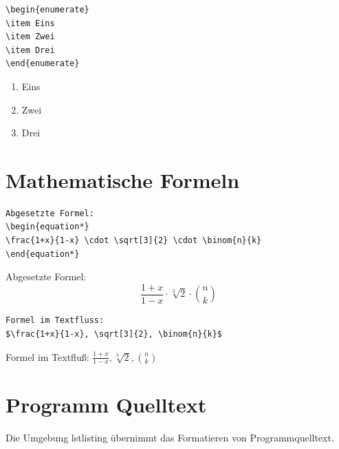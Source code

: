 \noindent
\begin{minipage}[c]{0.3\linewidth}
\begin{Verbatim}[frame=single]
\begin{enumerate}
\item Eins
\item Zwei
\item Drei
\end{enumerate}
\end{Verbatim}
\end{minipage}
\begin{minipage}[c]{0.5\linewidth}
\begin{enumerate}
\item Eins
\item Zwei
\item Drei
\end{enumerate}
\end{minipage}

\section{Mathematische Formeln}

\begin{Verbatim}[frame=single]
Abgesetzte Formel:
\begin{equation*}
\frac{1+x}{1-x} \cdot \sqrt[3]{2} \cdot \binom{n}{k}
\end{equation*}
\end{Verbatim}

Abgesetzte Formel:
\begin{equation*}
\frac{1+x}{1-x} \cdot \sqrt[3]{2} \cdot \binom{n}{k}
\end{equation*}

\begin{Verbatim}[frame=single]
Formel im Textfluss:
$\frac{1+x}{1-x}, \sqrt[3]{2}, \binom{n}{k}$
\end{Verbatim}

Formel im Textfluß: $\frac{1+x}{1-x}, \sqrt[3]{2}, \binom{n}{k}$
\\

\section{Programm Quelltext}

Die Umgebung lstlisting übernimmt das Formatieren von Programmquelltext.

